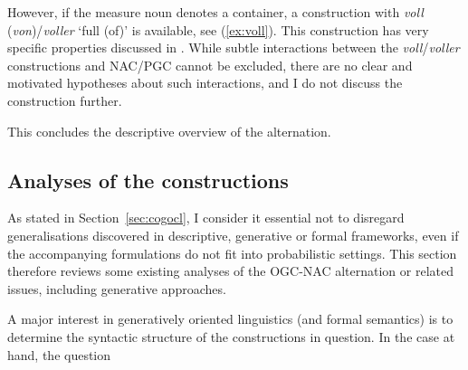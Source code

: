 \documentclass[USenglish]{article}
\begin{document}
However, if the measure noun denotes a container, a construction with \textit{voll} (\textit{von})\slash\textit{voller} `full (of)' is available, see (\ref{ex:voll}).
This construction has very specific properties discussed in \cite{Zeldes2018}.
While subtle interactions between the \textit{voll}\slash\textit{voller} constructions and NAC\slash PGC cannot be excluded, there are no clear and motivated hypotheses about such interactions, and I do not discuss the construction further.

\begin{exe}
  \ex\label{ex:voll}
  \begin{xlist}
  \end{xlist}
\end{exe}

This concludes the descriptive overview of the alternation.

\subsection{Analyses of the constructions}

As stated in Section~\ref{sec:cogocl}, I consider it essential not to disregard generalisations discovered in descriptive, generative or formal frameworks, even if the accompanying formulations do not fit into probabilistic settings.
This section therefore reviews some existing analyses of the OGC-NAC alternation or related issues, including generative approaches.


A major interest in generatively oriented linguistics (and formal semantics) is to determine the syntactic structure of the constructions in question.
In the case at hand, the question
\end{document}
